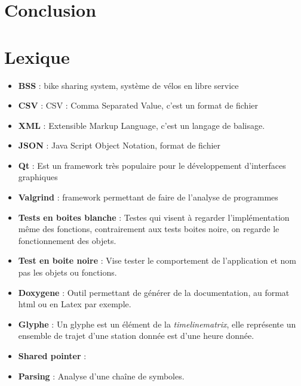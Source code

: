\documentclass[12pt]{article}
\begin{document}
	\newpage
	\section{Conclusion}

	\newpage
	\section{Lexique}
	\begin{itemize}
		\item[]\textbf{BSS} : bike sharing system, système de vélos en libre service\\
		\item[]\textbf{CSV} : CSV : Comma Separated Value, c'est un format de fichier\\
		\item[]\textbf{XML} : Extensible Markup Language, c'est un langage de balisage.\\
		\item[]\textbf{JSON} : Java Script Object Notation, format de fichier\\
		\item[]\textbf{Qt} : Est un framework très populaire pour le développement
		d'interfaces graphiques\\
		\item[]\textbf{Valgrind} : framework permettant de faire de l'analyse de programmes\\
		\item[]\textbf{Tests en boites blanche} : Testes qui visent à regarder l’implémentation même 
		des fonctions, contrairement aux tests boites noire, on regarde le fonctionnement des objets.\\
		\item[]\textbf{Test en boite noire} : Vise tester le comportement de l'application et nom pas 
		les objets ou fonctions.\\
		\item[]\textbf{Doxygene} : Outil permettant de générer de la documentation,
		au format html ou en Latex par exemple.\\
		\item[]\textbf{Glyphe} : Un glyphe est un élément de la \textit{timelinematrix}, elle
		représente un ensemble de trajet d'une station donnée est d'une heure donnée.\\
		\item[]\textbf{Shared pointer} :\\
		\item[]\textbf{Parsing} : Analyse d'une chaîne de symboles.\\

\end{itemize}
\end{document}
